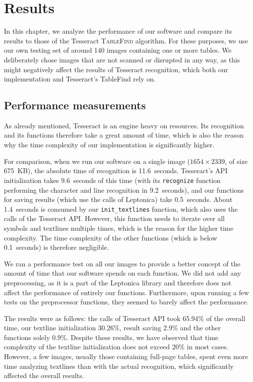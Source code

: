 \chapter{Results}

In this chapter, we analyze the performance of our software and compare its results to those of the Tesseract \textsc{TableFind} algorithm. For these purposes, we use our own testing set of around 140 images containing one or more tables. We deliberately chose images that are not scanned or disrupted in any way, as this might negatively affect the results of Tesseract recognition, which both our implementation and Tesseract's TableFind rely on.

\section{Performance measurements}

As already mentioned, Tesseract is an engine heavy on resources. Its recognition and its functions therefore take a great amount of time, which is also the reason why the time complexity of our implementation is significantly higher.

For comparison, when we run our software on a single image ($1654\times2339$, of size 675~KB), the absolute time of recognition is 11.6~seconds. Tesseract's API initialization takes 9.6~seconds of this time (with its \texttt{recognize} function performing the character and line recognition in 9.2~seconds), and our functions for saving results (which use the calls of Leptonica) take 0.5~seconds. About 1.4~seconds is consumed by our \texttt{init\_textlines} function, which also uses the calls of the Tesseract API. However, this function needs to iterate over all symbols and textlines multiple times, which is the reason for the higher time complexity. The time complexity of the other functions (which is below 0.1~seconds) is therefore negligible.

We ran a performance test on all our images to provide a better concept of the amount of time that our software spends on each function. We did not add any preprocessing, as it is a part of the Leptonica library and therefore does not affect the performance of entirely our functions. Furthermore, upon running a few tests on the preprocessor functions, they seemed to barely affect the performance.

The results were as follows: the calls of Tesseract API took 65.94\% of the overall time, our textline initialization 30.26\%, result saving 2.9\% and the other functions solely 0.9\%. Despite these results, we have observed that time complexity of the textline initialization does not exceed 20\% in most cases. However, a few images, usually those containing full-page tables, spent even more time analyzing textlines than with the actual recognition, which significantly affected the overall results.

